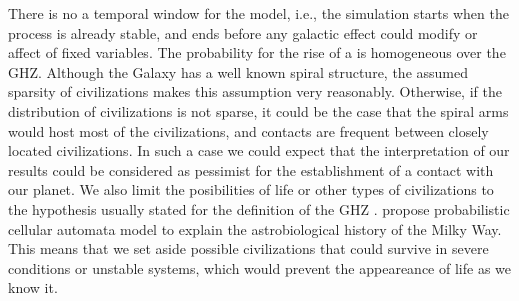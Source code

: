 There is no a temporal window for the model, i.e., the simulation
starts when the process is already stable, and ends before any
galactic effect could modify or affect of fixed variables.
%
The probability for the rise of a \ceti{} is homogeneous over the GHZ.
%
Although the Galaxy has a well known spiral structure, the assumed
sparsity of civilizations makes this assumption very reasonably.
%
Otherwise, if the distribution of civilizations is not sparse, it
could be the case that the spiral arms would host most of the
civilizations, and contacts are frequent between closely located
civilizations.
%
In such a case we could expect that the interpretation of our results
could be considered as pessimist for the establishment of a contact with
our planet.
%
We also limit the posibilities of life or other types of civilizations
to the hypothesis usually stated for the definition of the GHZ
\citep{dayal_habitability_2016, gonzalez_galactic_2001,
lineweaver_galactic_2004, gonzalez_habitable_2005,
morrison_extending_2015, haqq-misra_evolution_2019,
rahvar_cosmic_2016, gobat_evolution_2016, rahvar_cosmic_2016}.
%
\citet{vukotic_astrobiological_2012} propose probabilistic cellular
automata model to explain the astrobiological history of the Milky
Way.
%
This means that we set aside possible civilizations that could survive
in severe conditions or unstable systems, which would prevent the
appeareance of life as we know it.


